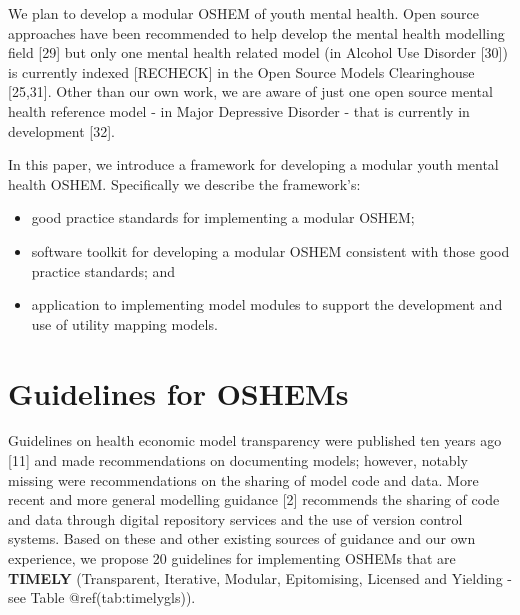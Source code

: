 \documentclass[
]{article}
\begin{document}
We plan to develop a modular OSHEM of youth mental health. Open source approaches have been recommended to help develop the mental health modelling field {[}29{]} but only one mental health related model (in Alcohol Use Disorder {[}30{]}) is currently indexed {[}RECHECK{]} in the Open Source Models Clearinghouse {[}25,31{]}. Other than our own work, we are aware of just one open source mental health reference model - in Major Depressive Disorder - that is currently in development {[}32{]}.

In this paper, we introduce a framework for developing a modular youth mental health OSHEM. Specifically we describe the framework's:

\begin{itemize}
\item
  good practice standards for implementing a modular OSHEM;
\item
  software toolkit for developing a modular OSHEM consistent with those good practice standards; and
\item
  application to implementing model modules to support the development and use of utility mapping models.
\end{itemize}

\hypertarget{guidelines-for-oshems}{%
\section{Guidelines for OSHEMs}\label{guidelines-for-oshems}}

Guidelines on health economic model transparency were published ten years ago {[}11{]} and made recommendations on documenting models; however, notably missing were recommendations on the sharing of model code and data. More recent and more general modelling guidance {[}2{]} recommends the sharing of code and data through digital repository services and the use of version control systems. Based on these and other existing sources of guidance and our own experience, we propose 20 guidelines for implementing OSHEMs that are \textbf{TIMELY} (Transparent, Iterative, Modular, Epitomising, Licensed and Yielding - see Table @ref(tab:timelygls)).
\end{document}
